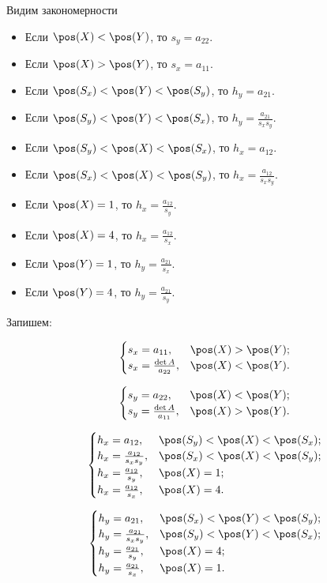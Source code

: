 Видим закономерности
\begin{itemize}
	\item Если $\pos(X) < \pos(Y)$, то $s_y = a_{22}$.
	\item Если $\pos(X) > \pos(Y)$, то $s_x = a_{11}$.
	\item Если $\pos(S_x) < \pos(Y) < \pos(S_y)$, то $h_y = a_{21}$.
	\item Если $\pos(S_y) < \pos(Y) < \pos(S_x)$, то $h_y = \frac{a_{21}}{s_x s_y}$.
	\item Если $\pos(S_y) < \pos(X) < \pos(S_x)$, то $h_x = a_{12}$.
	\item Если $\pos(S_x) < \pos(X) < \pos(S_y)$, то $h_x = \frac{a_{12}}{s_x s_y}$.
	\item Если $\pos(X) = 1$, то $h_x = \frac{a_{12}}{s_y}$.
	\item Если $\pos(X) = 4$, то $h_x = \frac{a_{12}}{s_x}$.
	\item Если $\pos(Y) = 1$, то $h_y = \frac{a_{21}}{s_x}$.
	\item Если $\pos(Y) = 4$, то $h_y = \frac{a_{21}}{s_y}$.
\end{itemize}

Запишем:

$$\begin{cases}
	s_x = a_{11}, & \pos(X) > \pos(Y);\\
	s_x = \frac{\det A}{a_{22}}, & \pos(X) < \pos(Y).
\end{cases}$$

$$\begin{cases}
	s_y = a_{22}, & \pos(X) < \pos(Y);\\
	s_y = \frac{\det A}{a_{11}}, & \pos(X) > \pos(Y).
\end{cases}$$

$$\begin{cases}
	h_x = a_{12}, & \pos(S_y) < \pos(X) < \pos(S_x);\\
	h_x = \frac{a_{12}}{s_x s_y}, & \pos(S_x) < \pos(X) < \pos(S_y);\\
	h_x = \frac{a_{12}}{s_y}, & \pos(X) = 1;\\
	h_x = \frac{a_{12}}{s_x}, & \pos(X) = 4.
\end{cases}$$

$$\begin{cases}
	h_y = a_{21}, & \pos(S_x) < \pos(Y) < \pos(S_y);\\
	h_y = \frac{a_{21}}{s_x s_y}, & \pos(S_y) < \pos(Y) < \pos(S_x);\\
	h_y = \frac{a_{21}}{s_y}, & \pos(X) = 4;\\
	h_y = \frac{a_{21}}{s_x}, & \pos(X) = 1.
\end{cases}$$

